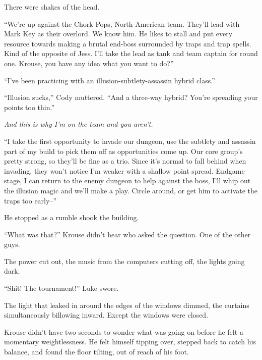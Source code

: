 There were shakes of the head.



``We're up against the Chork Pops, North American team.  They'll lead with Mark Key as their overlord.  We know him.  He likes to stall and put every resource towards making a brutal end-boss surrounded by traps and trap spells.  Kind of the opposite of Jess.  I'll take the lead as tank and team captain for round one.  Krouse, you have any idea what you want to do?''



``I've been practicing with an illusion-subtlety-assassin hybrid class.''



``Illusion sucks,'' Cody muttered.  ``And a three-way hybrid?  You're spreading your points too thin.''



\emph{And this is why I'm on the team and you aren't.}



``I take the first opportunity to invade our dungeon, use the subtlety and assassin part of my build to pick them off as opportunities come up.  Our core group's pretty strong, so they'll be fine as a trio.  Since it's normal to fall behind when invading, they won't notice I'm weaker with a shallow point spread.  Endgame stage, I can return to the enemy dungeon to help against the boss, I'll whip out the illusion magic and we'll make a play.  Circle around, or get him to activate the traps too early--''



He stopped as a rumble shook the building.



``What was that?''  Krouse didn't hear who asked the question.  One of the other guys.



The power cut out, the music from the computers cutting off, the lights going dark.



``Shit!  The tournament!''  Luke swore.



The light that leaked in around the edges of the windows dimmed, the curtains simultaneously billowing inward.  Except the windows were closed.



Krouse didn't have two seconds to wonder what was going on before he felt a momentary weightlessness.  He felt himself tipping over, stepped back to catch his balance, and found the floor tilting, out of reach of his foot.



